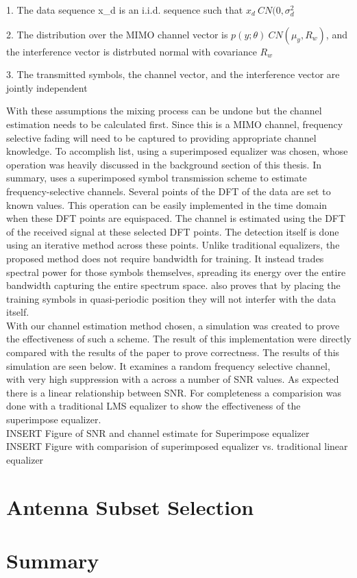 1. The data sequence x_{d} is an i.i.d. sequence such that \(x_{d}~CN(0,\sigma_{d}^{2}\)

2. The distribution over the MIMO channel vector is \(p(y;\theta)~CN(\mu_{y},R_{w})\), and the interference vector is distrbuted normal with covariance \(R_{w}\)

3. The transmitted symbols, the channel vector, and the interference vector are jointly independent

With these assumptions the mixing process can be undone but the channel estimation needs to be calculated first.  Since this is a MIMO channel, frequency selective fading will need to be captured to providing appropriate channel knowledge.  To accomplish list, using a superimposed equalizer was chosen, whose operation was heavily discussed in the background section of this thesis.  In summary, \cite{Ghogho} uses a superimposed symbol transmission scheme to estimate frequency-selective channels. Several points of the DFT of the data are set to known values. This operation can be easily implemented in the time domain when these DFT points are equispaced. The channel is estimated using the DFT of the received signal at these selected DFT points. The detection itself is done using an iterative method across these points.  Unlike traditional equalizers, the proposed method does not require bandwidth for training.  It instead trades spectral power for those symbols themselves, spreading its energy over the entire bandwidth capturing the entire spectrum space.   \cite{Ghogho} also proves that by placing the training symbols in quasi-periodic position they will not interfer with the data itself.\\

With our channel estimation method chosen, a simulation was created to prove the effectiveness of such a scheme.  The result of this implementation were directly compared with the results of the paper to prove correctness.  The results of this simulation are seen below.  It examines a random frequency selective channel, with very high suppression with a across a number of SNR values.  As expected there is a linear relationship between SNR.  For completeness a comparision was done with a traditional LMS equalizer to show the effectiveness of the superimpose equalizer.\\

INSERT Figure of SNR and channel estimate for Superimpose equalizer\\

INSERT Figure with comparision of superimposed equalizer vs. traditional linear equalizer\\


\section{Antenna Subset Selection}


\section{Summary}
